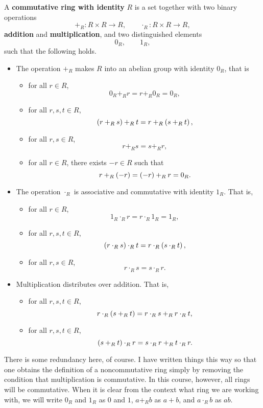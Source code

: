 \begin{definition}
A \textbf{commutative ring with identity} $ R $ is a set together with two binary operations
$$ +_R : R \times R \to R, \qquad \cdot_R : R \times R \to R, $$
\textbf{addition} and \textbf{multiplication}, and two distinguished elements
$$ 0_R, \qquad 1_R, $$
such that the following holds.
\begin{itemize}
\item The operation $ +_R $ makes $ R $ into an abelian group with identity $ 0_R $, that is
\begin{itemize}
\item for all $ r \in R $,
$$ 0_R +_R r = r +_R 0_R = 0_R, $$
\item for all $ r, s, t \in R $,
$$ \left( r +_R s \right) +_R t = r +_R \left( s +_R t \right), $$
\item for all $ r, s \in R $,
$$ r +_R s = s +_R r, $$
\item for all $ r \in R $, there exists $ -r \in R $ such that
$$ r +_R \left( -r \right) = \left( -r \right) +_R r = 0_R. $$
\end{itemize}
\item The operation $ \cdot_R $ is associative and commutative with identity $ 1_R $. That is,
\begin{itemize}
\item for all $ r \in R $,
$$ 1_R \cdot_R r = r \cdot_R 1_R = 1_R, $$
\item for all $ r, s, t \in R $,
$$ \left( r \cdot_R s \right) \cdot_R t = r \cdot_R \left( s \cdot_R t \right), $$
\item for all $ r, s \in R $,
$$ r \cdot_R s = s \cdot_R r. $$
\end{itemize}
\item Multiplication distributes over addition. That is,
\begin{itemize}
\item for all $ r, s, t \in R $,
$$ r \cdot_R \left( s +_R t \right) = r \cdot_R s +_R r \cdot_R t, $$
\item for all $ r, s, t \in R $,
$$ \left( s +_R t \right) \cdot_R r = s \cdot_R r +_R t \cdot_R r. $$
\end{itemize}
\end{itemize}
\end{definition}

There is some redundancy here, of course. I have written things this way so that one obtains the definition of a noncommutative ring simply by removing the condition that multiplication is commutative. In this course, however, all rings will be commutative. When it is clear from the context what ring we are working with, we will write $ 0_R $ and $ 1_R $ as $ 0 $ and $ 1 $, $ a +_R b $ as $ a + b $, and $ a \cdot_R b $ as $ ab $.

